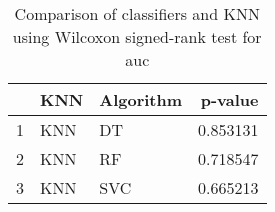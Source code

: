 \begin{table}
\footnotesize
\caption{Comparison of classifiers and KNN using Wilcoxon signed-rank test for auc}
\label{tab:KNN wilcoxon AUC comparison}
\begin{tabular}{lllr}
\hline
 & KNN & Algorithm & p-value \\
\hline
1 & KNN & DT & 0.853131 \\
2 & KNN & RF & 0.718547 \\
3 & KNN & SVC & 0.665213 \\
\hline
\end{tabular}
\end{table}
